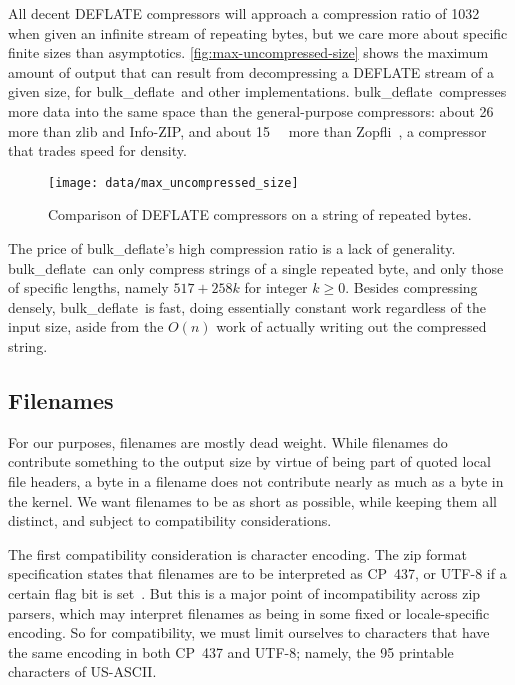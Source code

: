 \documentclass[letterpaper,twocolumn,10pt]{article}
\newcommand{\kB}{\kilo\byte}
\newcommand{\bulkdeflate}{\mbox{bulk\_deflate}}
\begin{document}

All decent DEFLATE compressors will approach a compression ratio of \num{1032}
when given an infinite stream of repeating bytes,
but we care more about specific finite sizes
than asymptotics.
\autoref{fig:max-uncompressed-size} shows the
maximum amount of output
that can result from decompressing a DEFLATE stream of a given size,
for \bulkdeflate\ and other implementations.
\bulkdeflate\ compresses more data
into the same space than the general-purpose compressors:
about \SI{26}{\kB} more than zlib and Info-ZIP,
and about \SI{15}{\kB} more than Zopfli~\cite{zopfli},
a compressor that trades speed for density.

\begin{figure}
\texttt{[image: data/max\_uncompressed\_size]}
\caption{
Comparison of DEFLATE compressors
on a string of repeated bytes.
}
\label{fig:max-uncompressed-size}
\end{figure}

The price of \bulkdeflate's high compression ratio is a lack of generality.
\bulkdeflate\ can only compress strings of a single repeated byte,
and only those of specific lengths,
namely $517 + 258 k$ for integer $k \ge 0$.
Besides compressing densely, \bulkdeflate\ is fast,
doing essentially constant work regardless of the input size,
aside from the $O(n)$ work of actually writing out the compressed string.

\subsection{Filenames}
\label{sec:filenames}

For our purposes, filenames are mostly dead weight.
While filenames do contribute something to the output size
by virtue of being part of quoted local file headers,
a byte in a filename does not contribute nearly as much
as a byte in the kernel.
We want filenames to be as short as possible,
while keeping them all distinct,
and subject to compatibility considerations.

The first compatibility consideration is character encoding.
The zip format specification states that filenames
are to be interpreted as CP~437,
or \mbox{UTF-8} if a certain flag bit is set~\cite[Appendix~D]{appnote}.
But this is a major point of incompatibility
across zip parsers,
which may interpret filenames as being in
some fixed or locale-specific encoding.
So for compatibility, we must limit ourselves to characters
that have the same encoding in both
CP~437 and \mbox{UTF-8};
namely, the \num{95} printable characters of \mbox{US-ASCII}.
\end{document}
